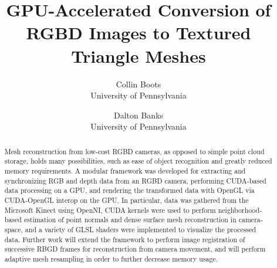 \documentclass{jcgt}
\begin{document}
\title{GPU-Accelerated Conversion of RGBD Images to Textured Triangle Meshes}

\author
       {Collin Boots\\University of Pennsylvania
        \and Dalton Banks\\University of Pennsylvania
       }



\maketitle

\begin{abstract}
\small
Mesh reconstruction from low-cost RGBD cameras, as opposed to simple point cloud storage, holds many possibilities, such as ease of object recognition and greatly reduced memory requirements. A modular framework was developed for extracting and synchronizing RGB and depth data from an RGBD camera, performing CUDA-based data processing on a GPU, and rendering the transformed data with OpenGL via CUDA-OpenGL interop on the GPU. In particular, data was gathered from the Microsoft Kinect using OpenNI, CUDA kernels were used to perform neighborhood-based estimation of point normals and dense surface mesh reconstruction in camera-space, and a variety of GLSL shaders were implemented to visualize the processed data. Further work will extend the framework to perform image registration of successive RBGD frames for reconstruction from camera movement, and will perform adaptive mesh resampling in order to further decrease memory usage.
\end{abstract}


\end{document}

